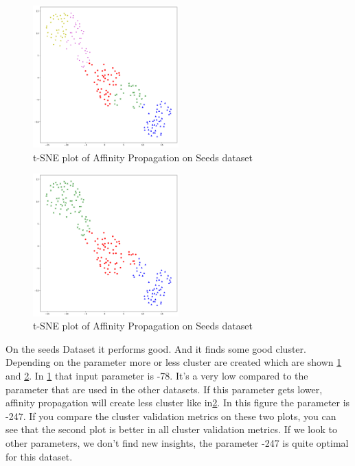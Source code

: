 \begin{figure}[H]
	\begin{center}
		\includegraphics[width=0.5\textwidth]{images/af_seed78.png}
	\caption{t-SNE plot of Affinity Propagation on Seeds dataset}
	\end{center}
	\label{fig:af_seeds78}
\end{figure}

\begin{figure}[H]
	\begin{center}
		\includegraphics[width=0.5\textwidth]{images/af_seeds247.png}
		\caption{t-SNE plot of Affinity Propagation on Seeds dataset}
	\end{center}
	\label{fig:af_seeds2}
\end{figure}

On the seeds Dataset it performs good. And it finds some good cluster. Depending on the parameter more or less cluster are created which are shown \ref{fig:af_seeds78} and \ref{fig:af_seeds2}. In \ref{fig:af_seeds78} that input parameter is -78. It’s a very low compared to the parameter that are used in the other datasets. If this parameter gets lower, affinity propagation will create less cluster like in\ref{fig:af_seeds2}. In this figure the parameter is -247. If you compare the cluster validation metrics on these two plots, you can see that the second plot is better in all cluster validation metrics. If we look to other parameters, we don’t find new insights, the parameter -247 is quite optimal for this dataset. 

